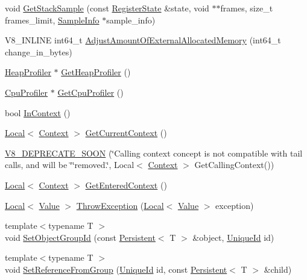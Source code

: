 \begin{DoxyCompactItemize}
\item 
void \hyperlink{classv8_1_1Isolate_a8b173b48a477267ccd6c7d17c492b82e}{Get\+Stack\+Sample} (const \hyperlink{structv8_1_1RegisterState}{Register\+State} \&state, void $\ast$$\ast$frames, size\+\_\+t frames\+\_\+limit, \hyperlink{structv8_1_1SampleInfo}{Sample\+Info} $\ast$sample\+\_\+info)
\item 
V8\+\_\+\+I\+N\+L\+I\+NE int64\+\_\+t \hyperlink{classv8_1_1Isolate_aaeda5fa60961a3d9d476c46200e30711}{Adjust\+Amount\+Of\+External\+Allocated\+Memory} (int64\+\_\+t change\+\_\+in\+\_\+bytes)
\item 
\hyperlink{classv8_1_1HeapProfiler}{Heap\+Profiler} $\ast$ \hyperlink{classv8_1_1Isolate_a9c48259615e8370f6f0efd27cd7f99a6}{Get\+Heap\+Profiler} ()
\item 
\hyperlink{classv8_1_1CpuProfiler}{Cpu\+Profiler} $\ast$ \hyperlink{classv8_1_1Isolate_a7eb415d9210d912aa57877ab6416fec8}{Get\+Cpu\+Profiler} ()
\item 
bool \hyperlink{classv8_1_1Isolate_afb6bbd31a87d0999dbbe5402447690a9}{In\+Context} ()
\item 
\hyperlink{classv8_1_1Local}{Local}$<$ \hyperlink{classv8_1_1Context}{Context} $>$ \hyperlink{classv8_1_1Isolate_afa1b6cde5a7a7cfde87eaabc4ab34062}{Get\+Current\+Context} ()
\item 
\hyperlink{classv8_1_1Isolate_adf1b08359e4162ee05caab23377dbc9d}{V8\+\_\+\+D\+E\+P\+R\+E\+C\+A\+T\+E\+\_\+\+S\+O\+ON} (\char`\"{}Calling context concept is not compatible with tail calls, and will be \char`\"{}\char`\"{}removed.\char`\"{}, Local$<$ \hyperlink{classv8_1_1Context}{Context} $>$ Get\+Calling\+Context())
\item 
\hyperlink{classv8_1_1Local}{Local}$<$ \hyperlink{classv8_1_1Context}{Context} $>$ \hyperlink{classv8_1_1Isolate_aff9eb2f5d199f8fcf59d9699194cd2e3}{Get\+Entered\+Context} ()
\item 
\hyperlink{classv8_1_1Local}{Local}$<$ \hyperlink{classv8_1_1Value}{Value} $>$ \hyperlink{classv8_1_1Isolate_aba648b3c00dc9f1ef2a22195d99e22e8}{Throw\+Exception} (\hyperlink{classv8_1_1Local}{Local}$<$ \hyperlink{classv8_1_1Value}{Value} $>$ exception)
\item 
{\footnotesize template$<$typename T $>$ }\\void \hyperlink{classv8_1_1Isolate_ae4418cb238686a321aa406e90c72fab5}{Set\+Object\+Group\+Id} (const \hyperlink{classv8_1_1Persistent}{Persistent}$<$ T $>$ \&object, \hyperlink{classv8_1_1UniqueId}{Unique\+Id} id)
\item 
{\footnotesize template$<$typename T $>$ }\\void \hyperlink{classv8_1_1Isolate_a0f8484db111e967d70ea7551b3593ce6}{Set\+Reference\+From\+Group} (\hyperlink{classv8_1_1UniqueId}{Unique\+Id} id, const \hyperlink{classv8_1_1Persistent}{Persistent}$<$ T $>$ \&child)
$$
\end{DoxyCompactItemize}
